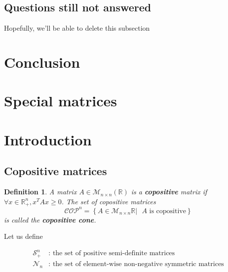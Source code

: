 \documentclass[onecolumn,11pt,a4paper]{article}
\theoremstyle{plain}  %
\newtheorem{defn}[theorem]{Definition}
\theoremstyle{remark}  %
\begin{document}
\subsection{Questions still not answered}
Hopefully, we'll be able to delete this subsection \smiley{}
\label{sub:questions}
\section{Conclusion}
\appendix
\section{Special matrices }
\newpage
\normalsize
\section{Introduction}
\label{sec:introduction}
\subsection{Copositive matrices}

\begin{defn}
	A matrix $A \in \mathcal{M}_{n \times n} \left( \mathbb{R} \right)$ is a \textbf{copositive} matrix if
	$\forall x \in \mathbb{R}_+^n, x^T A x \ge 0$. The set of copositive matrices
	\[ \mathcal{COP}^n = \left\{ A \in \mathcal{M}_{n \times n} \mathbb{R} |
	\text{ $A$ is
		copositive}\right\} \]
	 is called the \textbf{copositive cone}.
\end{defn}

Let us define 

\begin{align*}
	\mathcal{S}_+^n & : \text{ the set of positive semi-definite matrices} \\
	\mathcal{N}_n  & : \text{ the set of element-wise non-negative symmetric matrices} \\
	\label{}
\end{align*}
\end{document}
